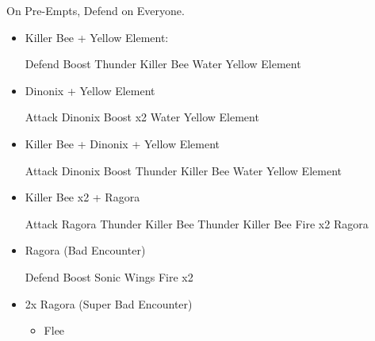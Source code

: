 \begin{encounters}
	On Pre-Empts, Defend on Everyone.
	\begin{itemize}
		\item Killer Bee + Yellow Element:
		      \begin{itemize}
			      \tidusf Defend
			      \summon{\valefor}
			      \valeforf Boost
			      \valeforf Thunder Killer Bee
		            \valeforf Water Yellow Element
		      \end{itemize}
		\item Dinonix + Yellow Element
		      \begin{itemize}
			      \tidusf Attack Dinonix
			      \summon{\valefor}
			      \valeforf Boost x2
			      \valeforf Water Yellow Element
		      \end{itemize}
		\item Killer Bee + Dinonix + Yellow Element
		      \begin{itemize}
			      \tidusf Attack Dinonix
			      \summon{\valefor}
			      \valeforf Boost
			      \valeforf Thunder Killer Bee
			      \valeforf Water Yellow Element
		      \end{itemize}
		\item Killer Bee x2 + Ragora
			\begin{itemize}
				\tidusf Attack Ragora
				\summon{\valefor}
				\valeforf Thunder Killer Bee
				\valeforf Thunder Killer Bee
				\valeforf Fire x2 Ragora
			\end{itemize}
		\item Ragora (Bad Encounter)
		      \begin{itemize}
			      \tidusf Defend
			      \summon{\valefor}
			      \valeforf Boost
			      \valeforf Sonic Wings
			      \valeforf Fire x2
		      \end{itemize}
		\item 2x Ragora (Super Bad Encounter)
		      \begin{itemize}
			      \tidusf Defend
			      \summon{\valefor}
			      \valeforf Boost
			      \valeforf Dismiss
			      \wakkaf Defend
			      \item Flee
		      \end{itemize}
	\end{itemize}
\end{encounters}
